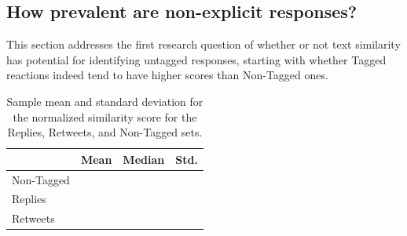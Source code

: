 \subsection{How prevalent are non-explicit responses?}

This section addresses the first research question of whether or not text similarity has potential for identifying untagged responses, starting with whether Tagged reactions indeed tend to have higher scores than Non-Tagged ones. 

\begin{table}[!tb]
	\centering
	\fontsize{9pt}{10pt}\selectfont
		\caption{Sample mean and standard deviation for the normalized similarity score for the Replies, Retweets, and Non-Tagged sets.}
		\begin{tabular}{l|c|c|c|}
			\cline{2-4}
												& Mean					& Median					& Std. \\ \hline 
			\multicolumn{1}{|l|}{Non-Tagged}	& \nonTaggedScoreMean{}	&	\nonTaggedScoreMedian{}	& \nonTaggedScoreStd{} \\ \hline
			\multicolumn{1}{|l|}{Replies}		& \repliesScoreMean{}	&	\repliesScoreMedian{}	& \repliesScoreStd{} \\ \hline
			\multicolumn{1}{|l|}{Retweets}		& \retweetsScoreMean{}	&	\retweetsScoreMedian{}	& \retweetsScoreStd{} \\ \hline
		\end{tabular}
	\label{tab:sampleDistributionsStatistics}
\end{table}

